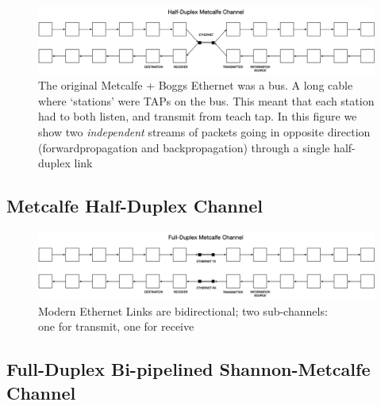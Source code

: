 \documentclass[../HFT-main.tex]{subfiles}
\begin{document}
\begin{figure}
\includegraphics[width=\textwidth]{../figures/Half-Duplex-Metcalfe.png}
  \caption{The original Metcalfe + Boggs Ethernet was a bus. A long cable where `stations' were TAPs on the bus. This meant that each station had to both listen, and transmit from teach tap. In this figure we show two \emph{independent} streams of packets going in opposite direction (forwardpropagation and backpropagation) through a single half-duplex link}
\end{figure}



\subsection{Metcalfe Half-Duplex Channel}

\begin{figure}
\includegraphics[width=\textwidth]{../figures/Full-Duplex-Metcalfe.png}
  \caption{Modern Ethernet Links are bidirectional; two sub-channels: \\one for transmit,  one for receive}
\end{figure}



\subsection{Full-Duplex Bi-pipelined Shannon-Metcalfe Channel}
\end{document}
